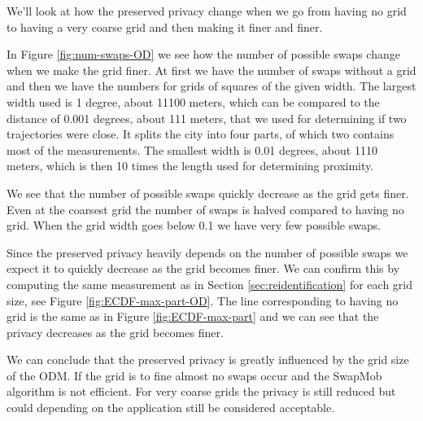 \documentclass{llncs}
\begin{document}
We'll look at how the preserved privacy change when we go from having
no grid to having a very coarse grid and then making it finer and
finer.

In Figure \ref{fig:num-swaps-OD} we see how the number of possible
swaps change when we make the grid finer. At first we have the number
of swaps without a grid and then we have the numbers for grids of
squares of the given width. The largest width used is 1 degree, about
11100 meters, which can be compared to the distance of 0.001 degrees,
about 111 meters, that we used for determining if two trajectories
were close. It splits the city into four parts, of which two contains
most of the measurements. The smallest width is 0.01 degrees, about
1110 meters, which is then 10 times the length used for determining
proximity.

We see that the number of possible swaps quickly decrease as the grid
gets finer. Even at the coarsest grid the number of swaps is halved
compared to having no grid. When the grid width goes below 0.1 we have
very few possible swaps.

Since the preserved privacy heavily depends on the number of possible
swaps we expect it to quickly decrease as the grid becomes finer. We
can confirm this by computing the same measurement as in Section
\ref{sec:reidentification} for each grid size, see Figure
\ref{fig:ECDF-max-part-OD}. The line corresponding to having no grid
is the same as in Figure \ref{fig:ECDF-max-part} and we can see that
the privacy decreases as the grid becomes finer.

We can conclude that the preserved privacy is greatly influenced by
the grid size of the ODM. If the grid is to fine almost no swaps occur
and the SwapMob algorithm is not efficient. For very coarse grids the
privacy is still reduced but could depending on the application still
be considered acceptable.
\end{document}
